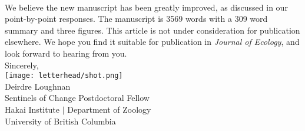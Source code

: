 \documentclass[11pt,a4paper]{article}
\begin{document}
\vspace{1.5ex}\\
We believe the new manuscript has been greatly improved, as discussed in our point-by-point responses. The manuscript is 3569 words with a 309 word summary and three figures. This article is not under consideration for publication elsewhere. We hope you find it suitable for publication in \emph{Journal of Ecology}, and look forward to hearing from you. 
\vspace{1.5ex}\\
\noindent Sincerely, \\
\texttt{[image: letterhead/shot.png]} \\ 
\noindent Deirdre Loughnan\\
\noindent Sentinels of Change Postdoctoral Fellow\\ %
\noindent Hakai Institute $|$ Department of Zoology\\
\noindent University of British Columbia
\newpage
\end{document}
